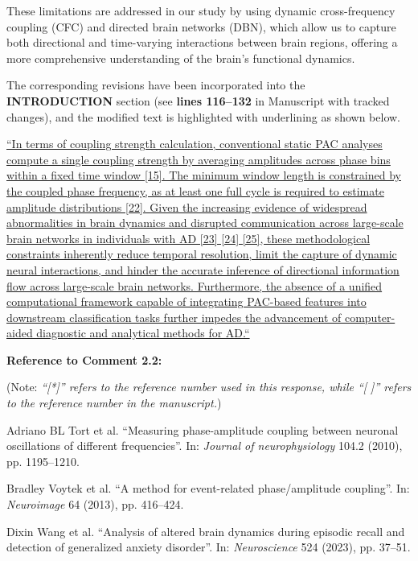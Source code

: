 \documentclass[12pt,technote,onecolumn]{IEEEtran}
\begin{document}
These limitations are addressed in our study by using dynamic cross-frequency coupling (CFC) and directed brain networks (DBN), which allow us to capture both directional and time-varying interactions between brain regions, offering a more comprehensive understanding of the brain’s functional dynamics.

The corresponding revisions have been incorporated into the \textbf{INTRODUCTION} section (see \textbf{lines 116–132} in Manuscript with tracked changes), and the modified text is highlighted with underlining as shown below.

\uline{``In terms of coupling strength calculation, conventional static PAC analyses compute a single coupling strength by averaging amplitudes across phase bins within a fixed time window [15]. The minimum window length is constrained by the coupled phase frequency, as at least one full cycle is required to estimate amplitude distributions [22]. Given the increasing evidence of widespread abnormalities in brain dynamics and disrupted communication across large-scale brain networks in individuals with AD [23] [24] [25], these methodological constraints inherently reduce temporal resolution, limit the capture of dynamic neural interactions, and hinder the accurate inference of directional information flow across large-scale brain networks. Furthermore, the absence of a unified computational framework capable of integrating PAC-based features into downstream classification tasks further impedes the advancement of computer-aided diagnostic and analytical methods for AD.“}

\vspace{1mm}

\noindent \textbf{Reference to Comment 2.2:} 

\noindent(Note: \textit{``[*]'' refers to the reference number used in this response, while ``[ ]'' refers to the reference number in the manuscript.})

\noindent[15]\:Adriano BL Tort et al. ``Measuring phase-amplitude
coupling between neuronal oscillations of different frequencies”. In: \textit{Journal of neurophysiology} 104.2 (2010), pp. 1195–1210.

\noindent[22]\:Bradley Voytek et al. ``A method for event-related phase/amplitude coupling”. In: \textit{Neuroimage} 64 (2013), pp. 416–424.

\noindent[23]\:Dixin Wang et al. ``Analysis of altered brain dynamics during episodic recall and detection of generalized anxiety disorder”. In: \textit{Neuroscience} 524 (2023), pp. 37–51.
\end{document}
